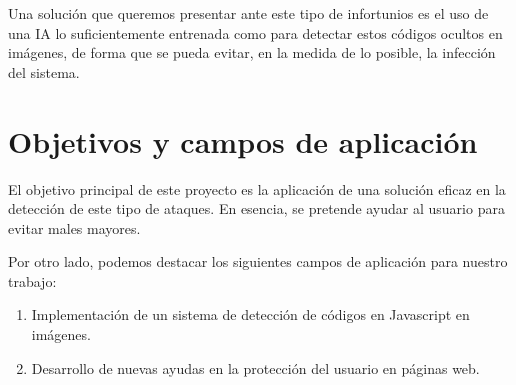\documentclass[12pt,oneside,a4paper]{article}
\begin{document}
Una solución que queremos presentar ante este tipo de infortunios es el uso de una IA lo suficientemente entrenada como para detectar estos códigos ocultos en imágenes, de forma que se pueda evitar, en la medida de lo posible, la infección del sistema.





\section{Objetivos y campos de aplicación}

El objetivo principal de este proyecto es la aplicación de una solución eficaz en la detección de este tipo de ataques. En esencia, se pretende ayudar al usuario para evitar males mayores.

Por otro lado, podemos destacar los siguientes campos de aplicación para nuestro trabajo:
\begin{enumerate}
	\item Implementación de un sistema de detección de códigos en Javascript en imágenes.
	\item Desarrollo de nuevas ayudas en la protección del usuario en páginas web.
\end{enumerate}
\end{document}
